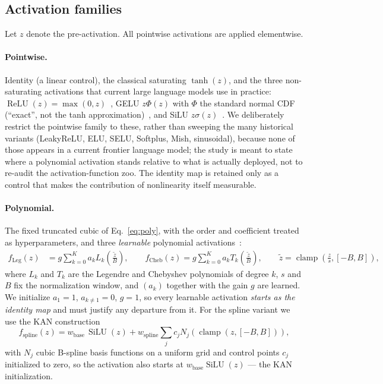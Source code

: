 \subsection{Activation families}

Let $z$ denote the pre-activation. All pointwise activations are applied
elementwise.

\paragraph{Pointwise.}
Identity (a linear control), the classical saturating $\tanh(z)$, and the
three non-saturating activations that current large language models use in
practice: $\operatorname{ReLU}(z) = \max(0,z)$~\citep{glorot2011deep}, GELU
$z\Phi(z)$ with $\Phi$ the
standard normal CDF (``exact'', not the tanh
approximation)~\citep{hendrycks2016gaussian}, and SiLU
$z\sigma(z)$~\citep{elfwing2018sigmoid}. We deliberately restrict the pointwise
family to these, rather
than sweeping the many historical variants (LeakyReLU, ELU, SELU, Softplus,
Mish, sinusoidal), because none of those appears in a current frontier
language model; the study is meant to state where a polynomial activation
stands relative to what is actually deployed, not to re-audit the
activation-function zoo. The identity map is retained only as a control that
makes the contribution of nonlinearity itself measurable.

\paragraph{Polynomial.}
The fixed truncated cubic of Eq.~\eqref{eq:poly}, with the order and
coefficient treated as hyperparameters, and three \emph{learnable} polynomial
activations~\citep{liu2024kan}:
\begin{align}
f_{\text{Leg}}(z) &= g \sum_{k=0}^{K} a_k L_k\!\left(\frac{\tilde{z}}{B}\right),
\qquad
f_{\text{Cheb}}(z) = g \sum_{k=0}^{K} a_k T_k\!\left(\frac{\tilde{z}}{B}\right),
\qquad
\tilde{z} = \operatorname{clamp}\!\left(\frac{z}{s}, [-B, B]\right),
\end{align}
where $L_k$ and $T_k$ are the Legendre and Chebyshev polynomials of degree
$k$, $s$ and $B$ fix the normalization window, and $(a_k)$ together with the
gain $g$ are learned. We initialize $a_1 = 1$, $a_{k \neq 1} = 0$, $g = 1$,
so every learnable activation \emph{starts as the identity map} and must
justify any departure from it.
For the spline variant we use the KAN construction
\begin{equation}
f_{\text{spline}}(z) = w_{\text{base}}\,\operatorname{SiLU}(z) +
  w_{\text{spline}} \sum_{j} c_j N_j(\operatorname{clamp}(z,[-B,B])),
\end{equation}
with $N_j$ cubic B-spline basis functions on a uniform grid and control
points $c_j$ initialized to zero, so the activation also starts at
$w_{\text{base}}\operatorname{SiLU}(z)$ --- the KAN initialization.


